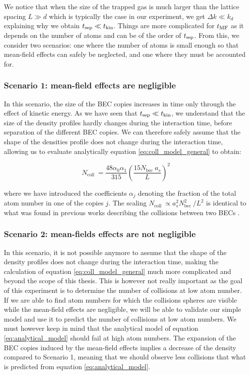 \noindent We notice that when the size of the trapped gas is much larger than the lattice spacing $L \gg d$ which is typically the case in our experiment, we get $\Delta k \ll k_d$ explaining why we obtain $t_{\rm{sep}} \ll t_{\rm{kin}}$. Things are more complicated for $t_{\rm{MF}}$ as it depends on the number of atoms and can be of the order of $t_{\rm{sep}}$. From this, we consider two scenarios: one where the number of atoms is small enough so that mean-field effects can safely be neglected, and one where they must be accounted for.

\subsubsection{Scenario 1: mean-field effects are negligible}

In this scenario, the size of the BEC copies increases in time only through the effect of kinetic energy. As we have seen that $t_{\rm{sep}} \ll t_{\rm{kin}}$, we understand that the size of the density profiles hardly changes during the interaction time, \ie before separation of the different BEC copies. We can therefore safely assume that the shape of the densities profile does not change during the interaction time, allowing us to evaluate analytically equation \ref{eq:coll_model_general} to obtain:

\begin{equation}
    N_{\text {coll }}=\frac{48 \alpha_{0} \alpha_{1}}{315}\left(\frac{15 N_{\text {bec }} a_{s}}{L}\right)^{2}
    \label{eq:analytical_model}
\end{equation}

\noindent where we have introduced the coefficients $\alpha_j$ denoting the fraction of the total atom number in one of the copies $j$. The scaling $N_{\text {coll }} \propto a_{s}^{2} N_{\text {bec }}^{2} / L^{2}$ is identical to what was found in previous works describing the collisions between two BECs \cite{zin2005quantum,zin2006elastic}. 

\subsubsection{Scenario 2: mean-fields effects are not negligible}

In this scenario, it is not possible anymore to assume that the shape of the density profiles does not change during the interaction time, making the calculation of equation \ref{eq:coll_model_general} much more complicated and beyond the scope of this thesis. This is however not really important as the goal of this experiment is to determine the number of collisions at low atom number. If we are able to find atom numbers for which the collisions spheres are visible while the mean-field effects are negligible, we will be able to validate our simple model and use it to predict the number of collisions at low atom numbers. We must however keep in mind that the analytical model of equation \ref{eq:analytical_model} should fail at high atom numbers. The expansion of the BEC copies induced by the mean-field effects implies a decrease of the density compared to Scenario 1, meaning that we should observe less collisions that what is predicted from equation \ref{eq:analytical_model}.

